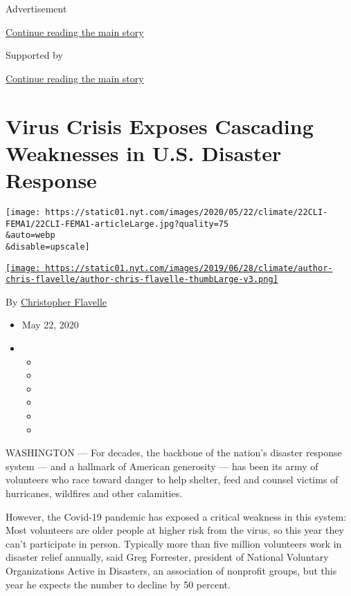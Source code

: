 Advertisement

\protect\hyperlink{after-top}{Continue reading the main story}

Supported by

\protect\hyperlink{after-sponsor}{Continue reading the main story}

\hypertarget{virus-crisis-exposes-cascading-weaknesses-in-us-disaster-response}{%
\section{Virus Crisis Exposes Cascading Weaknesses in U.S. Disaster
Response}\label{virus-crisis-exposes-cascading-weaknesses-in-us-disaster-response}}

\texttt{[image: https://static01.nyt.com/images/2020/05/22/climate/22CLI-FEMA1/22CLI-FEMA1-articleLarge.jpg?quality=75\\\&auto=webp\\\&disable=upscale]}

\href{https://www.nytimes.com/by/christopher-flavelle}{\texttt{[image: https://static01.nyt.com/images/2019/06/28/climate/author-chris-flavelle/author-chris-flavelle-thumbLarge-v3.png]}}

By \href{https://www.nytimes.com/by/christopher-flavelle}{Christopher
Flavelle}

\begin{itemize}
\item
  May 22, 2020
\item
  \begin{itemize}
  \item
  \item
  \item
  \item
  \item
  \item
  \end{itemize}
\end{itemize}

WASHINGTON --- For decades, the backbone of the nation's disaster
response system --- and a hallmark of American generosity --- has been
its army of volunteers who race toward danger to help shelter, feed and
counsel victims of hurricanes, wildfires and other calamities.

However, the Covid-19 pandemic has exposed a critical weakness in this
system: Most volunteers are older people at higher risk from the virus,
so this year they can't participate in person. Typically more than five
million volunteers work in disaster relief annually, said Greg
Forrester, president of National Voluntary Organizations Active in
Disasters, an association of nonprofit groups, but this year he expects
the number to decline by 50 percent.

